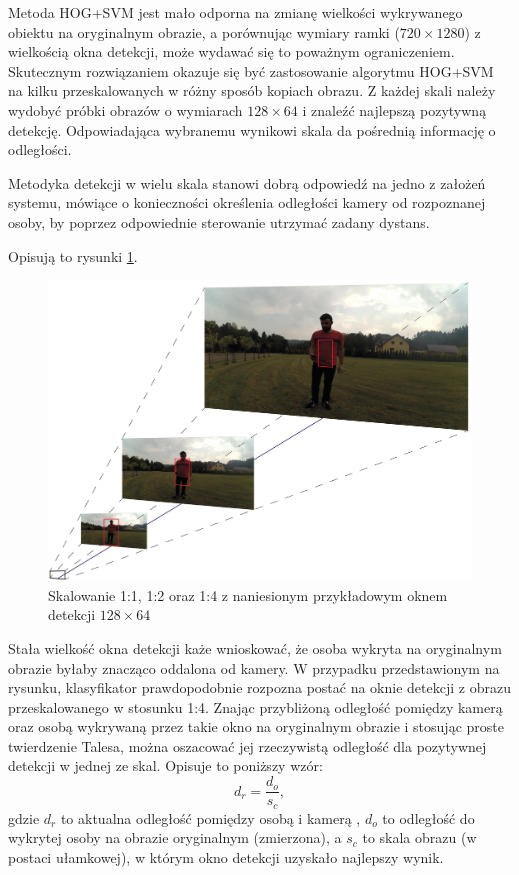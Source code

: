 Metoda HOG+SVM jest mało odporna na zmianę wielkości wykrywanego obiektu na oryginalnym obrazie, a porównując wymiary ramki ($720 \times 1280$) z wielkością okna detekcji, może wydawać się to poważnym ograniczeniem. Skutecznym rozwiązaniem okazuje się być zastosowanie algorytmu HOG+SVM na kilku przeskalowanych w różny sposób kopiach obrazu. Z każdej skali należy wydobyć próbki obrazów o wymiarach $128\times 64$ i znaleźć najlepszą pozytywną detekcję. Odpowiadająca wybranemu wynikowi skala da pośrednią informację o odległości. 

Metodyka detekcji w wielu skala stanowi dobrą odpowiedź na jedno z założeń systemu, mówiące o konieczności określenia odległości kamery od rozpoznanej osoby, by poprzez odpowiednie sterowanie utrzymać zadany dystans.  %

Opisują to rysunki \ref{fig:HOG_scaling}. %
\begin{figure}[h]
	\centering
	\captionsetup{justification=centering,margin=1cm}
	\hspace*{0cm}
	\includegraphics[width=15.5cm]{2_scaling.jpg}
	\caption{Skalowanie 1:1, 1:2 oraz 1:4 z naniesionym przykładowym oknem detekcji $128 \times 64$}
	\label{fig:HOG_scaling}
\end{figure}
\newline

Stała wielkość okna detekcji każe wnioskować, że osoba wykryta na oryginalnym obrazie byłaby znacząco oddalona od kamery. W przypadku przedstawionym na rysunku, klasyfikator prawdopodobnie rozpozna postać na oknie detekcji z obrazu przeskalowanego w stosunku 1:4. %
Znając przybliżoną odległość pomiędzy kamerą oraz osobą wykrywaną przez takie okno na oryginalnym obrazie i stosując proste twierdzenie Talesa, można oszacować jej rzeczywistą odległość dla pozytywnej detekcji w jednej ze skal. Opisuje to poniższy wzór:
\begin{equation}
\label{eq:scaling}
d_r=\frac{d_o}{s_c},
\end{equation}
gdzie $d_r$ to aktualna odległość pomiędzy osobą i kamerą , $d_o$ to odległość do wykrytej osoby na obrazie oryginalnym (zmierzona), a $s_c$ to skala obrazu (w postaci ułamkowej), w którym okno detekcji uzyskało najlepszy wynik.


